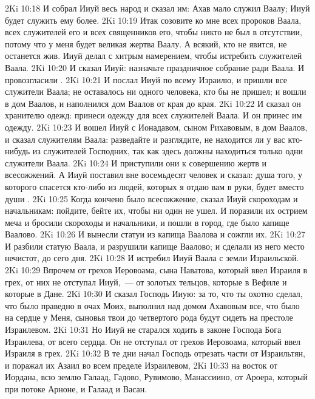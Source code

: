 \rsbpar\vs 2Ki 10:18 И собрал Ииуй весь народ и сказал им: Ахав мало служил Ваалу; Ииуй будет служить ему более.
\vs 2Ki 10:19 Итак созовите ко мне всех пророков Ваала, всех служителей его и всех священников его, чтобы никто не был в отсутствии, потому что у меня будет великая жертва Ваалу. А всякий, кто не явится, не останется жив. Ииуй делал  с хитрым намерением, чтобы истребить служителей Ваала.
\vs 2Ki 10:20 И сказал Ииуй: назначьте праздничное собрание ради Ваала. И провозгласили .
\vs 2Ki 10:21 И послал Ииуй по всему Израилю, и пришли все служители Ваала; не оставалось ни одного человека, кто бы не пришел; и вошли в дом Ваалов, и наполнился дом Ваалов от края до края.
\vs 2Ki 10:22 И сказал он хранителю одежд: принеси одежду для всех служителей Ваала. И он принес им одежду.
\vs 2Ki 10:23 И вошел Ииуй с Ионадавом, сыном Рихавовым, в дом Ваалов, и сказал служителям Ваала: разведайте и разглядите, не находится ли у вас кто-нибудь из служителей Господних, так как здесь должны находиться только одни служители Ваала.
\vs 2Ki 10:24 И приступили они к совершению жертв и всесожжений. А Ииуй поставил вне  восемьдесят человек и сказал: душа того, у которого спасется кто-либо из людей, которых я отдаю вам в руки, будет вместо души .
\rsbpar\vs 2Ki 10:25 Когда кончено было всесожжение, сказал Ииуй скороходам и начальникам: пойдите, бейте их, чтобы ни один не ушел. И поразили их острием меча и бросили  скороходы и начальники, и пошли в город, где было капище Ваалово.
\vs 2Ki 10:26 И вынесли статуи из капища Ваалова и сожгли их.
\vs 2Ki 10:27 И разбили статую Ваала, и разрушили капище Ваалово; и сделали из него место нечистот, до сего дня.
\vs 2Ki 10:28 И истребил Ииуй Ваала с земли Израильской.
\vs 2Ki 10:29 Впрочем от грехов Иеровоама, сына Наватова, который ввел Израиля в грех, от них не отступал Ииуй,~--- от золотых тельцов, которые в Вефиле и которые в Дане.
\rsbpar\vs 2Ki 10:30 И сказал Господь Ииую: за то, что ты охотно сделал, что было праведно в очах Моих, выполнил над домом Ахавовым все, что было на сердце у Меня, сыновья твои до четвертого рода будут сидеть на престоле Израилевом.
\vs 2Ki 10:31 Но Ииуй не старался ходить в законе Господа Бога Израилева, от всего сердца. Он не отступал от грехов Иеровоама, который ввел Израиля в грех.
\rsbpar\vs 2Ki 10:32 В те дни начал Господь отрезать части от Израильтян, и поражал их Азаил во всем пределе Израилевом,
\vs 2Ki 10:33 на восток от Иордана, всю землю Галаад,  Гадово, Рувимово, Манассиино,  от Ароера, который при потоке Арноне, и Галаад и Васан.

